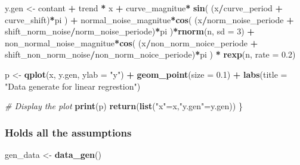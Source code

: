 \documentclass[
]{article}
\newenvironment{Shaded}{\begin{snugshade}}{\end{snugshade}}
\newcommand{\AttributeTok}[1]{\textcolor[rgb]{0.13,0.29,0.53}{#1}}
\newcommand{\CommentTok}[1]{\textcolor[rgb]{0.56,0.35,0.01}{\textit{#1}}}
\newcommand{\DecValTok}[1]{\textcolor[rgb]{0.00,0.00,0.81}{#1}}
\newcommand{\FloatTok}[1]{\textcolor[rgb]{0.00,0.00,0.81}{#1}}
\newcommand{\FunctionTok}[1]{\textcolor[rgb]{0.13,0.29,0.53}{\textbf{#1}}}
\newcommand{\NormalTok}[1]{#1}
\newcommand{\OtherTok}[1]{\textcolor[rgb]{0.56,0.35,0.01}{#1}}
\newcommand{\SpecialCharTok}[1]{\textcolor[rgb]{0.81,0.36,0.00}{\textbf{#1}}}
\newcommand{\StringTok}[1]{\textcolor[rgb]{0.31,0.60,0.02}{#1}}
\begin{document}
\begin{Shaded}
\begin{Highlighting}[]
\NormalTok{  y.gen }\OtherTok{\textless{}{-}}\NormalTok{ contant }\SpecialCharTok{+}
\NormalTok{    trend }\SpecialCharTok{*}\NormalTok{ x }\SpecialCharTok{+} 
\NormalTok{    curve\_magnitue}\SpecialCharTok{*} \FunctionTok{sin}\NormalTok{(}
\NormalTok{      (x}\SpecialCharTok{/}\NormalTok{curve\_period }\SpecialCharTok{+}\NormalTok{ curve\_shift)}\SpecialCharTok{*}\NormalTok{pi}
\NormalTok{      ) }\SpecialCharTok{+} 
\NormalTok{    normal\_noise\_magnitue}\SpecialCharTok{*}\FunctionTok{cos}\NormalTok{(}
\NormalTok{      (x}\SpecialCharTok{/}\NormalTok{norm\_noise\_periode }\SpecialCharTok{+}\NormalTok{ shift\_norm\_noise}\SpecialCharTok{/}\NormalTok{norm\_noise\_periode)}\SpecialCharTok{*}\NormalTok{pi}
\NormalTok{      )}\SpecialCharTok{*}\FunctionTok{rnorm}\NormalTok{(n, }\AttributeTok{sd =} \DecValTok{3}\NormalTok{) }\SpecialCharTok{+}
\NormalTok{    non\_normal\_noise\_magnitue}\SpecialCharTok{*}\FunctionTok{cos}\NormalTok{(}
\NormalTok{      (x}\SpecialCharTok{/}\NormalTok{non\_norm\_noice\_periode }\SpecialCharTok{+}\NormalTok{ shift\_non\_norm\_noise}\SpecialCharTok{/}\NormalTok{non\_norm\_noice\_periode)}\SpecialCharTok{*}\NormalTok{pi}
\NormalTok{      ) }\SpecialCharTok{*} \FunctionTok{rexp}\NormalTok{(n, }\AttributeTok{rate =} \FloatTok{0.2}\NormalTok{) }
  
\NormalTok{  p }\OtherTok{\textless{}{-}} \FunctionTok{qplot}\NormalTok{(x, y.gen, }\AttributeTok{ylab =} \StringTok{"y"}\NormalTok{) }\SpecialCharTok{+}
    \FunctionTok{geom\_point}\NormalTok{(}\AttributeTok{size =} \FloatTok{0.1}\NormalTok{) }\SpecialCharTok{+}
    \FunctionTok{labs}\NormalTok{(}\AttributeTok{title =} \StringTok{"Data generate for linear regrestion"}\NormalTok{)}
  
  \CommentTok{\# Display the plot}
  \FunctionTok{print}\NormalTok{(p)}
  \FunctionTok{return}\NormalTok{(}\FunctionTok{list}\NormalTok{(}\StringTok{"x"}\OtherTok{=}\NormalTok{x,}\StringTok{"y.gen"}\OtherTok{=}\NormalTok{y.gen))}
\NormalTok{\}}
\end{Highlighting}
\end{Shaded}

\subsubsection{Holds all the
assumptions}\label{holds-all-the-assumptions}

\begin{Shaded}
\begin{Highlighting}[]
\NormalTok{gen\_data }\OtherTok{\textless{}{-}} \FunctionTok{data\_gen}\NormalTok{()}
\end{Highlighting}
\end{Shaded}
\end{document}
